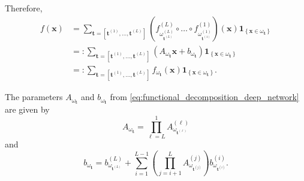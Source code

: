 Therefore, 
\begin{align}\label{eq:functional_decomposition_deep_network}
    f(\mathbf{x})&=\sum_{\mathbf{t}=\left[\mathbf{t}^{(1)},\dots,\mathbf{t}^{(L)}\right]}\left(f^{(L)}_{\omega^{(L)}_{\mathbf{t}^{(L)}}}\circ\dots\circ f^{(1)}_{\omega^{(1)}_{\mathbf{t}^{(1)}}}\right)(\mathbf{x})\mathbf{1}_{\left\{\mathbf{x}\in\omega_{\mathbf{t}}\right\}}\nonumber\\&=:\sum_{\mathbf{t}=\left[\mathbf{t}^{(1)},\dots,\mathbf{t}^{(L)}\right]}\left(A_{\omega_{\mathbf{t}}}\mathbf{x}+b_{\omega_{\mathbf{t}}}\right)\mathbf{1}_{\left\{\mathbf{x}\in\omega_{\mathbf{t}}\right\}}\nonumber\\&=:\sum_{\mathbf{t}=\left[\mathbf{t}^{(1)},\dots,\mathbf{t}^{(L)}\right]}f_{\omega_{\mathbf{t}}}(\mathbf{x})\mathbf{1}_{\left\{\mathbf{x}\in\omega_{\mathbf{t}}\right\}}.
\end{align}

\begin{proposition}\label{prop:expanding_dn_parameters_with_layer_parameters}
    The parameters $A_{\omega_{\mathbf{t}}}$ and $b_{\omega_{\mathbf{t}}}$ from \eqref{eq:functional_decomposition_deep_network} are given by $$A_{\omega_{\mathbf{t}}}=\prod_{\ell=L}^{1}A^{(\ell)}_{\omega_{\mathbf{t}^{(\ell)}}}$$and$$b_{\omega_{\mathbf{t}}}=b^{(L)}_{\omega_{\mathbf{t}^{(L)}}}+\sum_{i=1}^{L-1}\left(\prod_{j=i+1}^{L}A_{\omega_{\mathbf{t}^{(j)}}}^{(j)}\right)b^{(i)}_{\omega_{\mathbf{t}^{(i)}}}.$$
\end{proposition}

